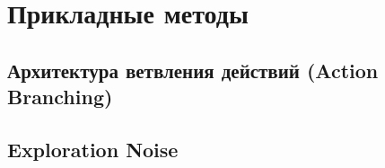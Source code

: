 \section{Прикладные методы}

\subsection{Архитектура ветвления действий (Action Branching)}



\subsection{Exploration Noise} %

